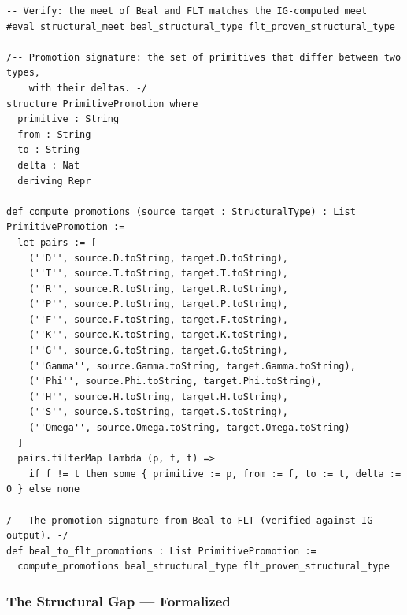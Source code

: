 \documentclass[12pt,a4paper]{article}
\begin{document}
\begin{lstlisting}[language=lean4]
-- Verify: the meet of Beal and FLT matches the IG-computed meet
#eval structural_meet beal_structural_type flt_proven_structural_type

/-- Promotion signature: the set of primitives that differ between two types,
    with their deltas. -/
structure PrimitivePromotion where
  primitive : String
  from : String
  to : String
  delta : Nat
  deriving Repr

def compute_promotions (source target : StructuralType) : List PrimitivePromotion :=
  let pairs := [
    (''D'', source.D.toString, target.D.toString),
    (''T'', source.T.toString, target.T.toString),
    (''R'', source.R.toString, target.R.toString),
    (''P'', source.P.toString, target.P.toString),
    (''F'', source.F.toString, target.F.toString),
    (''K'', source.K.toString, target.K.toString),
    (''G'', source.G.toString, target.G.toString),
    (''Gamma'', source.Gamma.toString, target.Gamma.toString),
    (''Phi'', source.Phi.toString, target.Phi.toString),
    (''H'', source.H.toString, target.H.toString),
    (''S'', source.S.toString, target.S.toString),
    (''Omega'', source.Omega.toString, target.Omega.toString)
  ]
  pairs.filterMap lambda (p, f, t) =>
    if f != t then some { primitive := p, from := f, to := t, delta := 0 } else none

/-- The promotion signature from Beal to FLT (verified against IG output). -/
def beal_to_flt_promotions : List PrimitivePromotion :=
  compute_promotions beal_structural_type flt_proven_structural_type
\end{lstlisting}

\subsubsection{The Structural Gap --- Formalized}
\end{document}
